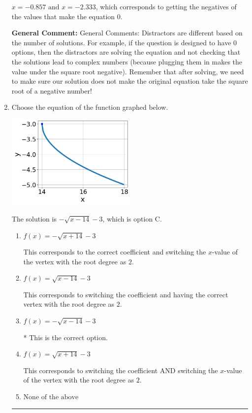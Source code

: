 \documentclass{extbook}[14pt]
\newcommand{\litem}[1]{\item #1

\rule{\textwidth}{0.4pt}}
\begin{document}
\begin{enumerate}
{\begin{enumerate}[label=\Alph*.]
$x = -0.857 \text{ and } x = -2.333$, which corresponds to getting the negatives of the values that make the equation 0.
\end{enumerate}

\textbf{General Comment:} General Comments: Distractors are different based on the number of solutions. For example, if the question is designed to have 0 options, then the distractors are solving the equation and not checking that the solutions lead to complex numbers (because plugging them in makes the value under the square root negative). Remember that after solving, we need to make sure our solution does not make the original equation take the square root of a negative number!
}
\litem{
Choose the equation of the function graphed below.

\begin{center}
    \includegraphics[width=0.5\textwidth]{../Figures/radicalGraphToEquationCopyA.png}
\end{center}



The solution is \( - \sqrt{x - 14} - 3 \), which is option C.\begin{enumerate}[label=\Alph*.]
\item \( f(x) = - \sqrt{x + 14} - 3 \)

This corresponds to the correct coefficient and switching the $x$-value of the vertex with the root degree as $2$.
\item \( f(x) = \sqrt{x - 14} - 3 \)

This corresponds to switching the coefficient and having the correct vertex with the root degree as $2$.
\item \( f(x) = - \sqrt{x - 14} - 3 \)

* This is the correct option.
\item \( f(x) = \sqrt{x + 14} - 3 \)

This corresponds to switching the coefficient AND switching the $x$-value of the vertex with the root degree as $2$.
\item \( \text{None of the above} \)


\end{enumerate}}
\end{enumerate}
\end{document}
